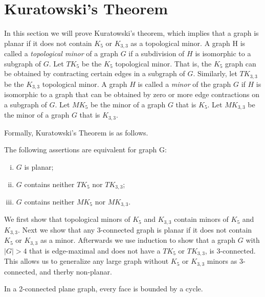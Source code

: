 \section{Kuratowski's Theorem}
In this section we will prove Kuratowski's theorem, which implies that a graph is planar if it does not contain $K_5$ or $K_{3,3}$ as a topological minor. A graph H is called a \emph{topological minor} of a graph $G$ if a subdivision of $H$ is isomorphic to a subgraph of $G$. Let $TK_5$ be the $K_5$ topological minor. That is, the $K_5$ graph can be obtained by contracting certain edges in a subgraph of $G$. Similarly, let $TK_{3,3}$ be the $K_{3,3}$ topological minor. A graph $H$ is called a \emph{minor} of the graph $G$ if $H$ is isomorphic to a graph that can be obtained by zero or more edge contractions on a subgraph of $G$. Let $MK_5$ be the minor of a graph $G$ that is $K_5$. Let $MK_{3,3}$ be the minor of a graph $G$ that is $K_{3,3}$. 

Formally, Kuratowski's Theorem is as follows.
\begin{theorem}
The following assertions are equivalent for graph G:
\begin{enumerate}[(i)] 
\item{$G$ is planar;}
\item{$G$ contains neither $TK_5$ nor $TK_{3,3}$;}
\item{$G$ contains neither $MK_5$ nor $MK_{3,3}$.}
\end{enumerate}
\end{theorem}

We first show that topological minors of $K_5$ and $K_{3,3}$ contain minors of $K_5$ and $K_{3,3}$. Next we show that any 3-connected graph is planar if it does not contain $K_5$ or $K_{3,3}$ as a minor. Afterwards we use induction to show that a graph $G$ with $|G| > 4$ that is edge-maximal and does not have a $TK_5$ or $TK_{3,3}$, is 3-connected. This allows us to generalize any large graph without $K_5$ or $K_{3,3}$ minors as 3-connected, and therby non-planar.

\begin{lemma}\label{lemma4.2.6}
In a 2-connected plane graph, every face is bounded by a cycle.
\end{lemma}

